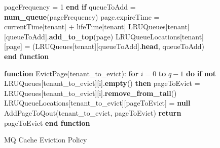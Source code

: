 \begin{figure}[htbp]
\begin{minipage}{\linewidth}
\begin{algorithm}[H]
\begin{algorithmic}
            \STATE \hspace{\algorithmicindent} \hspace{\algorithmicindent} pageFrequency = 1
            \STATE \hspace{\algorithmicindent} \textbf{end if}
            \STATE \hspace{\algorithmicindent} queueToAdd = \textbf{num\_queue}(pageFrequency)
            \STATE \hspace{\algorithmicindent} page.expireTime = currentTime[tenant] + lifeTime[tenant]
            \STATE \hspace{\algorithmicindent} LRUQueues[tenant][queueToAdd].\textbf{add\_to\_top}(page)
            \STATE \hspace{\algorithmicindent} LRUQueueLocations[tenant][page] = (LRUQueues[tenant][queueToAdd].\textbf{head}, queueToAdd)
            \STATE \textbf{end function}

            \STATE
            \STATE \textbf{function} EvictPage(tenant\_to\_evict):
            \STATE \hspace{\algorithmicindent} \textbf{for} $i = 0$ \textbf{to} $q - 1$ \textbf{do}
            \STATE \hspace{\algorithmicindent} \hspace{\algorithmicindent} \textbf{if} \textbf{not} LRUQueues[tenant\_to\_evict][i].\textbf{empty}() \textbf{then}
            \STATE \hspace{\algorithmicindent} \hspace{\algorithmicindent} \hspace{\algorithmicindent} pageToEvict = LRUQueues[tenant\_to\_evict][i].\textbf{remove\_from\_tail}()
            \STATE \hspace{\algorithmicindent} \hspace{\algorithmicindent} \hspace{\algorithmicindent} LRUQueueLocations[tenant\_to\_evict][pageToEvict] = \textbf{null}
            \STATE \hspace{\algorithmicindent} \hspace{\algorithmicindent} \hspace{\algorithmicindent} AddPageToQout(tenant\_to\_evict, pageToEvict)
            \STATE \hspace{\algorithmicindent} \hspace{\algorithmicindent} \textbf{return} pageToEvict
            \STATE \textbf{end function}
        \end{algorithmic}
    \end{algorithm}
    \caption{MQ Cache Eviction Policy}
    \label{fig:mq}
    \end{minipage}
\end{figure}

